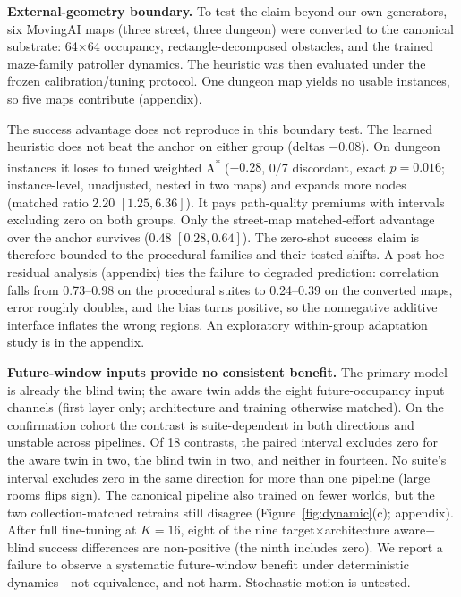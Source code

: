 \documentclass[letterpaper]{article} %
\begin{document}
\textbf{External-geometry boundary.} To test the claim beyond our own generators, six MovingAI maps \citep{sturtevant2012movingai} (three street, three dungeon) were converted to the canonical substrate: 64$\times$64 occupancy, rectangle-decomposed obstacles, and the trained maze-family patroller dynamics. The heuristic was then evaluated under the frozen calibration/tuning protocol. One dungeon map yields no usable instances, so five maps contribute (appendix).

The success advantage does not reproduce in this boundary test. The learned heuristic does not beat the anchor on either group (deltas $-0.08$). On dungeon instances it loses to tuned weighted A\textsuperscript{*} ($-0.28$, 0/7 discordant, exact $p{=}0.016$; instance-level, unadjusted, nested in two maps) and expands more nodes (matched ratio 2.20 $[1.25, 6.36]$). It pays path-quality premiums with intervals excluding zero on both groups. Only the street-map matched-effort advantage over the anchor survives (0.48 $[0.28, 0.64]$). The zero-shot success claim is therefore bounded to the procedural families and their tested shifts. A post-hoc residual analysis (appendix) ties the failure to degraded prediction: correlation falls from 0.73--0.98 on the procedural suites to 0.24--0.39 on the converted maps, error roughly doubles, and the bias turns positive, so the nonnegative additive interface inflates the wrong regions. An exploratory within-group adaptation study is in the appendix.

\textbf{Future-window inputs provide no consistent benefit.} The primary model is already the blind twin; the aware twin adds the eight future-occupancy input channels (first layer only; architecture and training otherwise matched). On the confirmation cohort the contrast is suite-dependent in both directions and unstable across pipelines. Of 18 contrasts, the paired interval excludes zero for the aware twin in two, the blind twin in two, and neither in fourteen. No suite's interval excludes zero in the same direction for more than one pipeline (large rooms flips sign). The canonical pipeline also trained on fewer worlds, but the two collection-matched retrains still disagree (Figure~\ref{fig:dynamic}(c); appendix). After full fine-tuning at $K{=}16$, eight of the nine target$\times$architecture aware$-$blind success differences are non-positive (the ninth includes zero). We report a failure to observe a systematic future-window benefit under deterministic dynamics---not equivalence, and not harm. Stochastic motion is untested.
\end{document}
